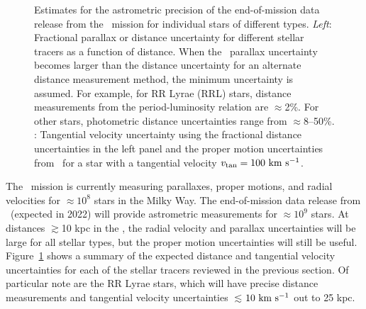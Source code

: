 \begin{figure}[h]
\centering
\caption{Estimates for the astrometric precision of the end-of-mission data
release from the \gaia\ mission for individual stars of different types.
\textit{Left}: Fractional parallax or distance uncertainty for different stellar
tracers as a function of distance. When the \gaia\ parallax uncertainty becomes
larger than the distance uncertainty for an alternate distance measurement
method, the minimum uncertainty is assumed. For example, for RR Lyrae (RRL)
stars, distance measurements from the period-luminosity relation are
$\approx$2\%. For other stars, photometric distance uncertainties range from
$\approx$8--50\%. : Tangential velocity uncertainty using the
fractional distance uncertainties in the left panel and the proper motion
uncertainties from \gaia\ for a star with a tangential velocity $v_{\rm tan} =
100~\mathrm{km}~\mathrm{s}^{-1}$.}
\label{fig:gaiastellarpops}
\end{figure}

The \gaia\ mission is currently measuring parallaxes, proper motions, and radial
velocities for $\approx$$10^{8}$ stars in the Milky Way. The end-of-mission data
release from \gaia\ (expected in 2022) will provide astrometric measurements for
$\approx$$10^{9}$ stars. At distances $\gtrsim$10 kpc in the \mwhalo, the radial
velocity and parallax uncertainties will be large for all stellar types, but the
proper motion uncertainties will still be useful.
Figure~\ref{fig:gaiastellarpops} shows a summary of the expected distance and
tangential velocity uncertainties for each of the stellar tracers reviewed in
the previous section. Of particular note are the RR Lyrae stars, which will have
precise distance measurements and tangential velocity uncertainties
$\lesssim$$10~\mathrm{km}~\mathrm{s}^{-1}$ out to 25 kpc.

